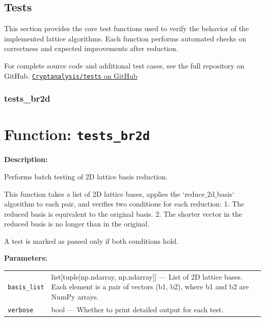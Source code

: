 \documentclass[a4paper,12pt]{article}
\begin{document}


\subsection{Tests}

This section provides the core test functions used to verify the behavior of the implemented lattice algorithms.  
Each function performs automated checks on correctness and expected improvements after reduction.

For complete source code and additional test cases, see the full repository on GitHub. 
\noindent
\href{https://github.com/SanyaKor/Cryptanalysis/tree/main/tests}{\texttt{Cryptanalysis/tests} on GitHub}
\\



\subsubsection{tests\_br2d}

\section*{Function: \texttt{tests\_br2d}}

\textbf{Description:}

Performs batch testing of 2D lattice basis reduction.

This function takes a list of 2D lattice bases, applies the `reduce$\_$2d$\_$basis` algorithm to each pair,
and verifies two conditions for each reduction:
  1. The reduced basis is equivalent to the original basis.
  2. The shorter vector in the reduced basis is no longer than in the original.

A test is marked as passed only if both conditions hold.

\vspace{1em}
\textbf{Parameters:}

\vspace{1em}
\noindent
\begin{tabular}{p{3cm} p{11cm}}
\texttt{basis\_list} & list[tuple[np.ndarray, np.ndarray]] — List of 2D lattice bases. Each element is a pair of vectors (b1, b2), where b1 and b2 are NumPy arrays. \\
\texttt{verbose} & bool — Whether to print detailed output for each test. \\
\end{tabular}
\end{document}
